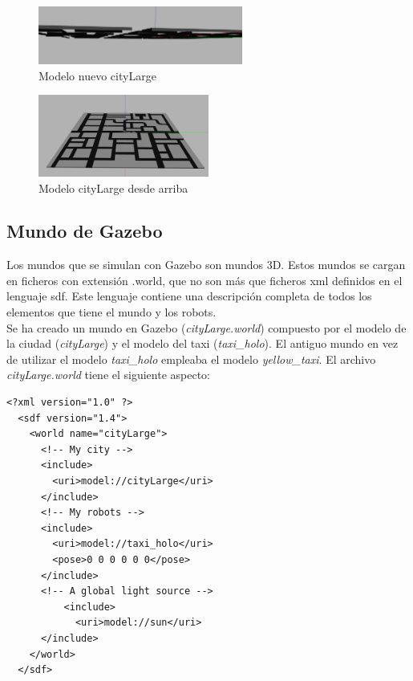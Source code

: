 \begin{figure}[H]
  \begin{center}
    \includegraphics[width=0.6\textwidth]{figures/GPP/Mundo_sinPalo.png}
		\caption{Modelo nuevo cityLarge}
		\label{fig.mundo_sinpalo}
		\end{center}
\end{figure}

\begin{figure}[H]
  \begin{center}
    \includegraphics[width=0.5\textwidth]{figures/GPP/citiLarge_modelo.png}
		\caption{Modelo cityLarge desde arriba}
		\label{fig.citiLarge}
		\end{center}
\end{figure}

\subsection{Mundo de Gazebo}
Los mundos que se simulan con Gazebo son mundos 3D. Estos mundos se cargan en ficheros con extensión .world, que no son más que ficheros \acrshort{xml} definidos en el lenguaje \acrshort{sdf}. Este lenguaje contiene una descripción completa de todos los elementos que tiene el mundo y los robots.\\


Se ha creado un mundo en Gazebo (\textit{cityLarge.world}) compuesto por el modelo de la ciudad (\textit{cityLarge}) y el modelo del taxi (\textit{taxi\_holo}). El antiguo mundo en vez de utilizar el modelo \textit{taxi\_holo} empleaba el modelo \textit{yellow\_taxi}. El archivo \textit{cityLarge.world} tiene el siguiente aspecto:

\vspace{20pt}
	\begin{lstlisting}[frame=single]
<?xml version="1.0" ?>
  <sdf version="1.4">
    <world name="cityLarge">
      <!-- My city -->
      <include>
        <uri>model://cityLarge</uri>
      </include>
      <!-- My robots -->
      <include>
        <uri>model://taxi_holo</uri>
        <pose>0 0 0 0 0 0</pose>
      </include>
      <!-- A global light source -->
          <include>
            <uri>model://sun</uri>
      </include>
    </world>
  </sdf>

	\end{lstlisting}

